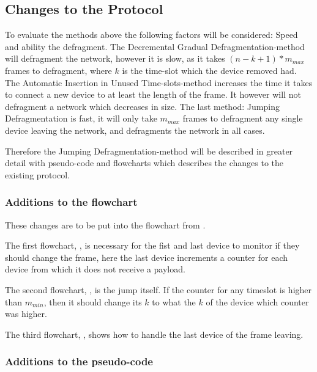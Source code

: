 \subsection{Changes to the Protocol}
To evaluate the methods above the following factors will be considered: Speed and ability the defragment.
The Decremental Gradual Defragmentation-method will defragment the network, however it is slow, as it takes $(n - k + 1) * m_{max}$ frames to defragment, where $k$ is the time-slot which the device removed had. 
The Automatic Insertion in Unused Time-slots-method increases the time it takes to connect a new device to at least the length of the frame. 
It however will not defragment a network which decreases in size. 
The last method: Jumping Defragmentation is fast, it will only take $m_{max}$ frames to defragment any single device leaving the network, and defragments the network in all cases. 

Therefore the Jumping Defragmentation-method will be described in greater detail with pseudo-code and flowcharts which describes the changes to the existing protocol. 

\subsubsection{Additions to the flowchart}
These changes are to be put into the flowchart from .

The first flowchart, , is necessary for the fist and last device to monitor if they should change the frame, here the last device increments a counter for each device from which it does not receive a payload.


The second flowchart, , is the jump itself.
If the counter for any timeslot is higher than $m_{min}$, then it should change its $k$ to what the $k$ of the device which counter was higher.

The third flowchart, , shows how to handle the last device of the frame leaving.


\subsubsection{Additions to the pseudo-code}
